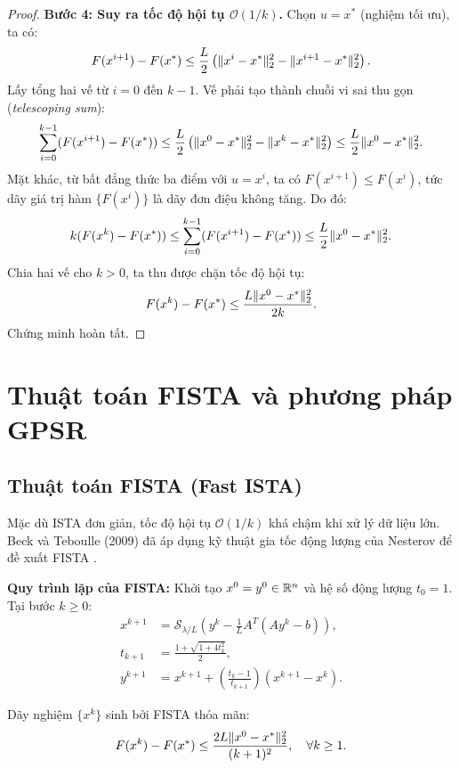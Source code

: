\begin{proof}
\textbf{Bước 4: Suy ra tốc độ hội tụ $\mathcal{O}(1/k)$.}
Chọn $u = x^*$ (nghiệm tối ưu), ta có:
\begin{equation}
    F(x^{i+1}) - F(x^*) \le \frac{L}{2} \left( \|x^i - x^*\|_2^2 - \|x^{i+1} - x^*\|_2^2 \right).
\end{equation}
Lấy tổng hai vế từ $i = 0$ đến $k - 1$. Vế phải tạo thành chuỗi vi sai thu gọn (\emph{telescoping sum}):
\begin{equation}
    \sum_{i=0}^{k-1} (F(x^{i+1}) - F(x^*)) \le \frac{L}{2} \left( \|x^0 - x^*\|_2^2 - \|x^k - x^*\|_2^2 \right) \le \frac{L}{2} \|x^0 - x^*\|_2^2.
\end{equation}
Mặt khác, từ bất đẳng thức ba điểm với $u = x^i$, ta có $F(x^{i+1}) \le F(x^i)$, tức dãy giá trị hàm $\{F(x^i)\}$ là dãy đơn điệu không tăng. Do đó:
\[
k (F(x^k) - F(x^*)) \le \sum_{i=0}^{k-1} (F(x^{i+1}) - F(x^*)) \le \frac{L}{2} \|x^0 - x^*\|_2^2.
\]
Chia hai vế cho $k > 0$, ta thu được chặn tốc độ hội tụ:
\[
F(x^k) - F(x^*) \le \frac{L \|x^0 - x^*\|_2^2}{2k}.
\]
Chứng minh hoàn tất.
\end{proof}

\section{Thuật toán FISTA và phương pháp GPSR}
\subsection{Thuật toán FISTA (Fast ISTA)}
Mặc dù ISTA đơn giản, tốc độ hội tụ $\mathcal{O}(1/k)$ khá chậm khi xử lý dữ liệu lớn. Beck và Teboulle (2009) đã áp dụng kỹ thuật gia tốc động lượng của Nesterov để đề xuất FISTA \cite{beck2009fast}.

\textbf{Quy trình lặp của FISTA:}
Khởi tạo $x^0 = y^0 \in \mathbb{R}^n$ và hệ số động lượng $t_0 = 1$. Tại bước $k \ge 0$:
\begin{align}
    x^{k+1} &= \mathcal{S}_{\lambda/L} \left( y^k - \frac{1}{L} A^T(A y^k - b) \right), \label{eq:fista_step1} \\[0.2cm]
    t_{k+1} &= \frac{1 + \sqrt{1 + 4 t_k^2}}{2}, \label{eq:fista_step2} \\[0.2cm]
    y^{k+1} &= x^{k+1} + \left( \frac{t_k - 1}{t_{k+1}} \right) (x^{k+1} - x^k). \label{eq:fista_step3}
\end{align}

\begin{theorem}
Dãy nghiệm $\{x^k\}$ sinh bởi FISTA thỏa mãn:
\begin{equation}
    F(x^k) - F(x^*) \le \frac{2 L \|x^0 - x^*\|_2^2}{(k + 1)^2}, \quad \forall k \ge 1.
\end{equation}
\end{theorem}

